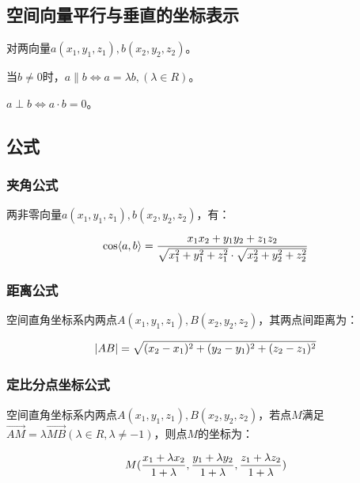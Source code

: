 \documentclass{ctexart}
\begin{document}
\subsection{空间向量平行与垂直的坐标表示}

对两向量$a(x_1,y_1,z_1),b(x_2,y_2,z_2)$。

当$b\neq 0$时，$a\parallel b\Longleftrightarrow a=\lambda b,(\lambda\in R)$。

$a\perp b\Longleftrightarrow a\cdot b=0$。

\subsection{公式}

\subsubsection{夹角公式}

两非零向量$a(x_1,y_1,z_1),b(x_2,y_2,z_2)$，有：

\begin{equation}
    \centering
    \cos\langle a,b\rangle=\frac{x_1x_2+y_1y_2+z_1z_2}{\sqrt{x_1^2+y_1^2+z_1^2}\cdot\sqrt{x_2^2+y_2^2+z_2^2}}
\end{equation}

\subsubsection{距离公式}

空间直角坐标系内两点$A(x_1,y_1,z_1),B(x_2,y_2,z_2)$，其两点间距离为：

\begin{equation}
    \centering
    \left|AB\right|=\sqrt{(x_2-x_1)^2+(y_2-y_1)^2+(z_2-z_1)^2}
\end{equation}

\subsubsection{定比分点坐标公式}

空间直角坐标系内两点$A(x_1,y_1,z_1),B(x_2,y_2,z_2)$，若点$M$满足$\overrightarrow{AM}=\lambda\overrightarrow{MB}(\lambda\in R,\lambda\neq -1)$，则点$M$的坐标为：

\begin{equation}
    \centering
    M(\frac{x_1+\lambda x_2}{1+\lambda},\frac{y_1+\lambda y_2}{1+\lambda},\frac{z_1+\lambda z_2}{1+\lambda})
\end{equation}
\end{document}
